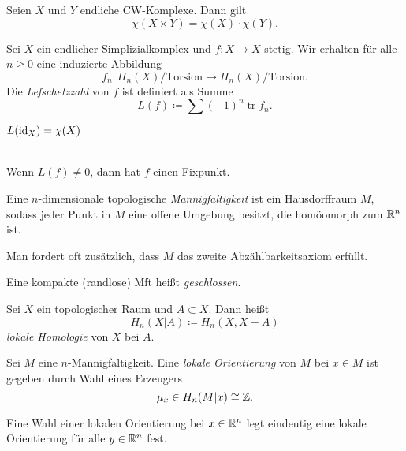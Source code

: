\documentclass{cheat-sheet}
\newcommand{\Torsion}{\mathrm{Torsion}} %
\DeclareMathOperator{\tr}{tr} %
\begin{document}
\begin{prop}
  Seien $X$ und $Y$ endliche CW-Komplexe. Dann gilt
  \[ \chi(X \times Y) = \chi(X) \cdot \chi(Y). \]
\end{prop}

\begin{defn}
  Sei $X$ ein endlicher Simplizialkomplex und $f : X \to X$ stetig. Wir erhalten für alle $n \geq 0$ eine induzierte Abbildung
  \[ f_n : H_n(X)/\Torsion \to H_n(X)/\Torsion. \]
  Die \emph{Lefschetzzahl} von $f$ ist definiert als Summe
  \[ L(f) \coloneqq \sum (-1)^n \tr f_n. \]
\end{defn}

\begin{bsp}
  $L(\operatorname{id}_X) = \chi(X)$
\end{bsp}

\begin{satz}\mbox{}\\
  Wenn $L(f) \not= 0$, dann hat $f$ einen Fixpunkt.
\end{satz}


\begin{defn}
  Eine $n$-dimensionale topologische \emph{Mannigfaltigkeit} ist ein Hausdorffraum $M$, sodass jeder Punkt in $M$ eine offene Umgebung besitzt, die homöomorph zum $\mathbb{R}^n$ ist.
\end{defn}

\begin{bem}
  Man fordert oft zusätzlich, dass $M$ das zweite Abzählbarkeitsaxiom erfüllt.
\end{bem}

\begin{defn}
  Eine kompakte (randlose) Mft heißt \emph{geschlossen}.
\end{defn}

\begin{defn}
  Sei $X$ ein topologischer Raum und $A \subset X$. Dann heißt
  \[ H_n(X|A) \coloneqq H_n(X, X-A) \]
  \emph{lokale Homologie} von $X$ bei $A$.
\end{defn}

\begin{defn}
  Sei $M$ eine $n$-Mannigfaltigkeit. Eine \emph{lokale Orientierung} von $M$ bei $x \in M$ ist gegeben durch Wahl eines Erzeugers
  \[ \mu_x \in H_n(M|x) \cong \mathbb{Z}. \]
\end{defn}

\begin{lem}
  Eine Wahl einer lokalen Orientierung bei $x \in \mathbb{R}^n$ legt eindeutig eine lokale Orientierung für alle $y \in \mathbb{R}^n$ fest.
\end{lem}
\end{document}
